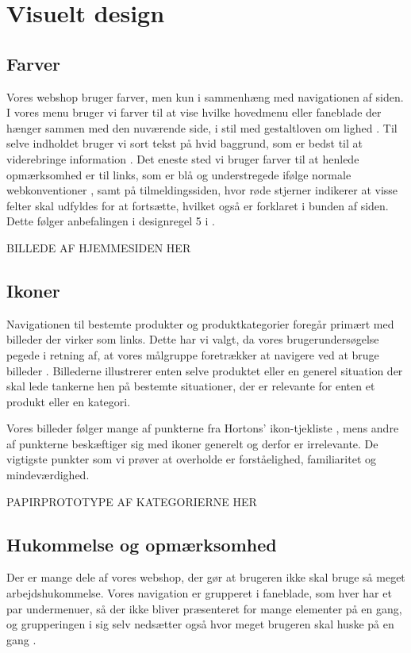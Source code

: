 \chapter{Visuelt design}

\section{Farver}
Vores webshop bruger farver, men kun i sammenhæng med navigationen af siden. I vores menu bruger vi farver til at vise hvilke hovedmenu eller faneblade
der hænger sammen med den nuværende side, i stil med gestaltloven om lighed \cite[s. 336]{Benyon2010}. Til selve indholdet bruger vi sort tekst
på hvid baggrund, som er bedst til at viderebringe information \cite[s. 430]{marcus}. Det eneste sted vi bruger farver til at henlede opmærksomhed er
til links, som er blå og understregede ifølge normale webkonventioner \cite[s. 385]{Benyon2010}, samt på tilmeldingssiden, hvor røde stjerner indikerer at visse felter skal udfyldes for at fortsætte, hvilket også er forklaret i bunden af siden. Dette følger anbefalingen i designregel 5 i \cite[s. 344]{Benyon2010}.

BILLEDE AF HJEMMESIDEN HER

\section{Ikoner}
Navigationen til bestemte produkter og produktkategorier foregår primært med billeder der virker som links. Dette har vi valgt, da vores brugerundersøgelse
pegede i retning af, at vores målgruppe foretrækker at navigere ved at bruge billeder \cite{os}. Billederne illustrerer enten selve produktet eller en generel situation
der skal lede tankerne hen på bestemte situationer, der er relevante for enten et produkt eller en kategori. 

Vores billeder følger mange af punkterne fra Hortons' ikon-tjekliste \cite[s. 327]{Benyon2010}, mens andre af punkterne beskæftiger sig med ikoner generelt
og derfor er irrelevante. De vigtigste punkter som vi prøver at overholde er forståelighed, familiaritet og mindeværdighed. 

PAPIRPROTOTYPE AF KATEGORIERNE HER

\section{Hukommelse og opmærksomhed}
Der er mange dele af vores webshop, der gør at brugeren ikke skal bruge så meget arbejdshukommelse. Vores navigation er grupperet i faneblade, som hver har et par
undermenuer, så der ikke bliver præsenteret for mange elementer på en gang, og grupperingen i sig selv nedsætter også hvor meget brugeren skal huske på en gang
\cite[s. 339]{Benyon2010}.

